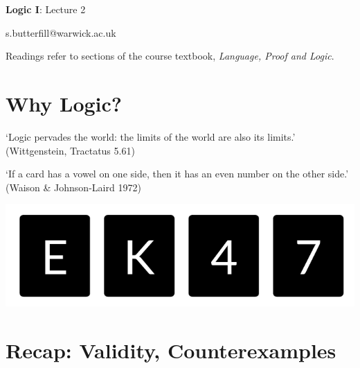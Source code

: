 \documentclass[12pt]{extarticle}
\date{}
\makeatletter
\def \ititle {Origins of Mind}
\def \isubtitle {Lecture 08}
\def \iemail{s.butterfill@warwick.ac.uk}
\makeatother
\begin{document}

\begin{multicols*}{3}

\setlength\footnotesep{1em}







\def \ititle {Logic I}
 
\def \isubtitle {Lecture 2}
 
\begin{center}
 
{\Large
 
\textbf{\ititle}: \isubtitle
 
}
 
 
 
\iemail %
 
\end{center}
 
Readings refer to sections of the course textbook, \emph{Language, Proof and Logic}.
 
 
 
\section{Why Logic?}
 
‘Logic pervades the world: the limits of the world are also its limits.’
(Wittgenstein, Tractatus 5.61)
 
‘If a card has a vowel on one side, then it has an even number on the other side.’
(Waison \& Johnson-Laird 1972)
 
\begin{center}
\includegraphics[scale=0.3]{img/waison_fig.png}
\end{center}
 
 
\section{Recap: Validity, Counterexamples}
 

\end{multicols*}
\end{document}
